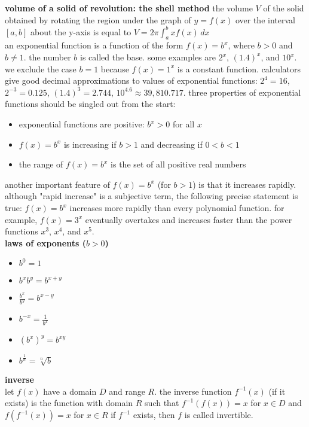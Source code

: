 \documentclass{article}
\begin{document}
\textbf{volume of a solid of revolution: the shell method} the volume $V$ of the solid obtained by rotating the region under the graph of $y = f(x)$ over the interval $[a, b]$ about the y-axis is equal to $V = 2\pi \int_{a}^{b}xf(x)\,dx$\\

\newpage
an exponential function is a function of the form $f(x) = b^x$, where $b > 0$ and $b \neq 1$. the number $b$ is called the base. some examples are $2^x$, $(1.4)^x$, and $10^x$. we exclude the case $b = 1$ because $f(x) = 1^x$ is a constant function. calculators give good decimal approximations to values of exponential functions: $2^4 = 16$, $2^{-3} = 0.125$, $(1.4)^3 = 2.744$, $10^{4.6} \approx 39,810.717$. three properties of exponential functions should be singled out from the start:
	\begin{itemize}
		\item exponential functions are positive: $b^x > 0$ for all $x$
		\item $f(x) = b^x$ is increasing if $b > 1$ and decreasing if $0 < b < 1$
		\item the range of $f(x) = b^x$ is the set of all positive real numbers
	\end{itemize}
another important feature of $f(x) = b^x$ (for $b > 1$) is that it increases rapidly. although "rapid increase" is a subjective term, the following precise statement is true: $f(x) = b^x$ increases more rapidly than every polynomial function. for example, $f(x) = 3^x$ eventually overtakes and increases faster than the power functions $x^3$, $x^4$, and $x^5$.\\

\textbf{laws of exponents ($b > 0$)}
	\begin{itemize}
		\item $b^0 = 1$
		\item $b^xb^y = b^{x + y}$
		\item $\frac{b^x}{b^y} = b^{x - y}$
		\item $b^{-x} = \frac{1}{b^x}$
		\item $(b^x)^y = b^{xy}$
		\item $b^{\frac{1}{n}} = \sqrt[n]{b}$
	\end{itemize}

\textbf{inverse}\\
let $f(x)$ have a domain $D$ and range $R$. the inverse function $f^{-1}(x)$ (if it exists) is the function with domain $R$ such that $f^{-1}(f(x)) = x$ for $x \in D$ and $f(f^{-1}(x)) = x$ for $x \in R$ if $f^{-1}$ exists, then $f$ is called invertible.\\
\end{document}

